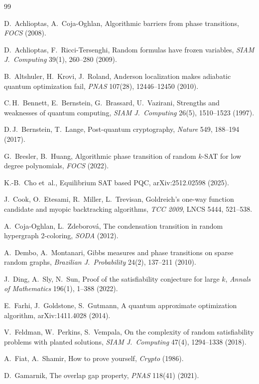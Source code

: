 \documentclass[11pt]{article}
\begin{document}
\begin{thebibliography}{99}

D.~Achlioptas, A.~Coja-Oghlan, Algorithmic barriers from phase transitions, \emph{FOCS} (2008).

D.~Achlioptas, F.~Ricci-Tersenghi, Random formulas have frozen variables, \emph{SIAM J.\ Computing} 39(1), 260--280 (2009).

B.~Altshuler, H.~Krovi, J.~Roland, Anderson localization makes adiabatic quantum optimization fail, \emph{PNAS} 107(28), 12446--12450 (2010).

C.\,H.~Bennett, E.~Bernstein, G.~Brassard, U.~Vazirani, Strengths and weaknesses of quantum computing, \emph{SIAM J.\ Computing} 26(5), 1510--1523 (1997).

D.\,J.~Bernstein, T.~Lange, Post-quantum cryptography, \emph{Nature} 549, 188--194 (2017).

G.~Bresler, B.~Huang, Algorithmic phase transition of random $k$-SAT for low degree polynomials, \emph{FOCS} (2022).

K.-B.~Cho et~al., Equilibrium SAT based PQC, arXiv:2512.02598 (2025).

J.~Cook, O.~Etesami, R.~Miller, L.~Trevisan, Goldreich's one-way function candidate and myopic backtracking algorithms, \emph{TCC 2009}, LNCS 5444, 521--538.

A.~Coja-Oghlan, L.~Zdeborov\'{a}, The condensation transition in random hypergraph 2-coloring, \emph{SODA} (2012).

A.~Dembo, A.~Montanari, Gibbs measures and phase transitions on sparse random graphs, \emph{Brazilian J.\ Probability} 24(2), 137--211 (2010).

J.~Ding, A.~Sly, N.~Sun, Proof of the satisfiability conjecture for large $k$, \emph{Annals of Mathematics} 196(1), 1--388 (2022).

E.~Farhi, J.~Goldstone, S.~Gutmann, A quantum approximate optimization algorithm, arXiv:1411.4028 (2014).

V.~Feldman, W.~Perkins, S.~Vempala, On the complexity of random satisfiability problems with planted solutions, \emph{SIAM J.\ Computing} 47(4), 1294--1338 (2018).

A.~Fiat, A.~Shamir, How to prove yourself, \emph{Crypto} (1986).

D.~Gamarnik, The overlap gap property, \emph{PNAS} 118(41) (2021).


\end{thebibliography}
\end{document}
